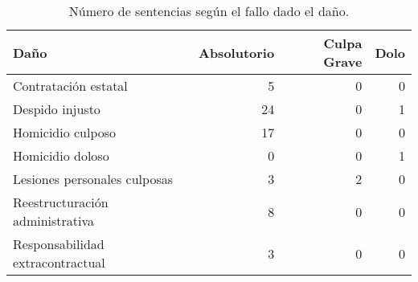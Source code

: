 \begin{table}[!htbp]
\centering
\caption{Número de sentencias según el fallo dado el daño.} 
\label{tab:danofallo}
\begin{tabular}{lrrr}
  \hline
Daño & Absolutorio & Culpa Grave & Dolo \\ 
  \hline
Contratación estatal &  5 &  0 &  0 \\ 
  Despido injusto & 24 &  0 &  1 \\ 
  Homicidio culposo & 17 &  0 &  0 \\ 
  Homicidio doloso &  0 &  0 &  1 \\ 
  Lesiones personales culposas &  3 &  2 &  0 \\ 
  Reestructuración administrativa &  8 &  0 &  0 \\ 
  Responsabilidad extracontractual &  3 &  0 &  0 \\ 
   \hline
\end{tabular}
\end{table}
